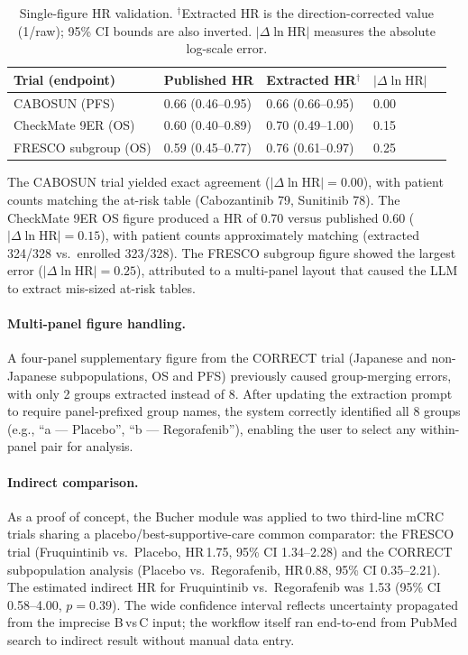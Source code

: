 \documentclass{amia}
\begin{document}
\begin{table}[H]
\begin{center}
\begin{tabular}{|p{4.2cm}|l|l|l|l|}
\hline
Trial (endpoint) & Published HR & Extracted HR$^\dagger$ & $|\Delta\ln\text{HR}|$ \\
\hline
CABOSUN\cite{cabosun2017} (PFS) & 0.66 (0.46–0.95) & 0.66 (0.66–0.95) & 0.00 \\
\hline
CheckMate 9ER\cite{checkmate9er2021} (OS) & 0.60 (0.40–0.89) & 0.70 (0.49–1.00) & 0.15 \\
\hline
FRESCO subgroup\cite{fresco2021} (OS) & 0.59 (0.45–0.77) & 0.76 (0.61–0.97) & 0.25 \\
\hline
\end{tabular}
\end{center}
\caption{Single-figure HR validation. $^\dagger$Extracted HR is the
direction-corrected value (1/raw); 95\% CI bounds are also inverted.
$|\Delta\ln\text{HR}|$ measures the absolute log-scale error.}
\label{tab:validation}
\end{table}

The CABOSUN trial yielded exact agreement ($|\Delta\ln\text{HR}|=0.00$),
with patient counts matching the at-risk table (Cabozantinib 79,
Sunitinib 78). The CheckMate 9ER OS figure produced a HR of 0.70 versus
published 0.60 ($|\Delta\ln\text{HR}|=0.15$), with patient counts
approximately matching (extracted 324/328 vs.\ enrolled 323/328).
The FRESCO subgroup figure showed the largest error ($|\Delta\ln\text{HR}|=0.25$),
attributed to a multi-panel layout that caused the LLM to extract
mis-sized at-risk tables.

\paragraph{Multi-panel figure handling.}
A four-panel supplementary figure from the CORRECT trial\cite{correct2015}
(Japanese and non-Japanese subpopulations, OS and PFS) previously caused
group-merging errors, with only 2 groups extracted instead of 8.
After updating the extraction prompt to require panel-prefixed group names,
the system correctly identified all 8 groups (e.g., ``a --- Placebo'',
``b --- Regorafenib''), enabling the user to select any within-panel pair
for analysis.

\paragraph{Indirect comparison.}
As a proof of concept, the Bucher module was applied to two third-line mCRC
trials sharing a placebo/best-supportive-care common comparator: the FRESCO
trial\cite{fresco2021} (Fruquintinib vs.\ Placebo, HR\,1.75, 95\% CI
1.34--2.28) and the CORRECT subpopulation analysis\cite{correct2015}
(Placebo vs.\ Regorafenib, HR\,0.88, 95\% CI 0.35--2.21). The estimated
indirect HR for Fruquintinib vs.\ Regorafenib was 1.53 (95\% CI 0.58--4.00,
$p=0.39$). The wide confidence interval reflects uncertainty propagated from
the imprecise B\,vs\,C input; the workflow itself ran end-to-end from
PubMed search to indirect result without manual data entry.
\end{document}
